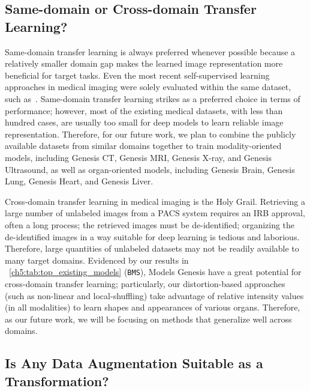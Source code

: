 \subsection{Same-domain or Cross-domain Transfer Learning?}
\label{ch5:same_cross_modality}

Same-domain transfer learning is always preferred whenever possible because a relatively smaller domain gap makes the learned image representation more beneficial for target tasks. Even the most recent self-supervised learning approaches in medical imaging were solely evaluated within the same dataset, such as~\citet{chen2019self,tajbakhsh2019surrogate,zhu2020rubik}. Same-domain transfer learning strikes as a preferred choice in terms of performance; however, most of the existing medical datasets, with less than hundred cases, are usually too small for deep models to learn reliable image representation. Therefore, for our future work, we plan to combine the publicly available datasets from similar domains together to train modality-oriented models, including Genesis CT, Genesis MRI, Genesis X-ray, and Genesis Ultrasound, as well as organ-oriented models, including Genesis Brain, Genesis Lung, Genesis Heart, and Genesis Liver. 

Cross-domain transfer learning in medical imaging is the Holy Grail. Retrieving a large number of unlabeled images from a PACS system requires an IRB approval, often a long process; the retrieved images must be de-identified; organizing the de-identified images in a way suitable for deep learning is tedious and laborious. Therefore, large quantities of unlabeled datasets may not be readily available to many target domains. Evidenced by our results in \tablename~\ref{ch5:tab:top_existing_models} (\texttt{BMS}), Models Genesis have a great potential for cross-domain transfer learning; particularly, our distortion-based approaches (such as non-linear and local-shuffling) take advantage of relative intensity values (in all modalities) to learn shapes and appearances of various organs. Therefore, as our future work, we will be focusing on methods that generalize well across domains. 


\subsection{Is Any Data Augmentation Suitable as a Transformation?} 
\label{ch5:choice_transformations}

